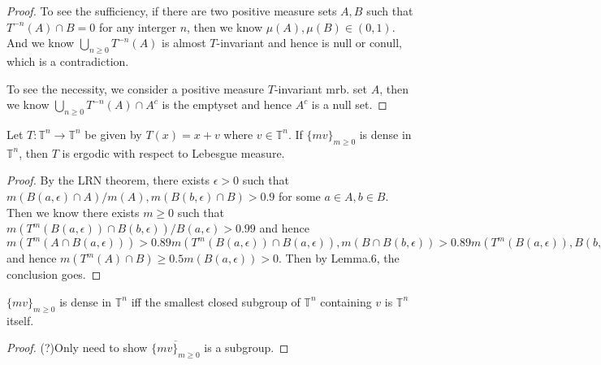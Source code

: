 \documentclass[lang=en, color=blue, ]{elegantbook}
\newcommand{\T}{\mathbb{T}}
\begin{document}
\begin{proof}\par
    To see the sufficiency, if there are two positive measure sets $A,B$ such that $T^{-n}(A)\cap B =0$ for any interger $n$, then we know $\mu(A),\mu(B)\in(0,1)$. And we know $\bigcup_{n\geq 0}T^{-n}(A)$ is almost $T$-invariant and hence is null or conull, which is a contradiction.\par
    To see the necessity, we consider a positive measure $T$-invariant mrb. set $A$, then we know $\bigcup_{n\geq 0}T^{-n}(A) \cap A^c$ is the emptyset and hence $A^c$ is a null set.
\end{proof}
\begin{lemma}
Let $T:\T^n\to \T^n$ be given by $T(x)=x+v$ where $v\in\T^n$. If $\{mv\}_{m\geq 0}$ is dense in $\T^n$, then $T$ is ergodic with respect to Lebesgue measure.
\end{lemma}
\begin{proof}\par
    By the LRN theorem, there exists $\epsilon > 0$ such that $m(B(a,\epsilon)\cap A)/m(A), m(B(b,\epsilon)\cap B)>0.9$ for some $a\in A,b\in B$. Then we know there exists $m\geq 0$ such that $m(T^m(B(a,\epsilon))\cap B(b,\epsilon))/B(a,\epsilon) > 0.99$ and hence $m(T^m(A\cap B(a,\epsilon))) > 0.89 m(T^m(B(a,\epsilon))\cap B(a,\epsilon)), m(B\cap B(b,\epsilon))> 0.89 m(T^m(B(a,\epsilon)),B(b,\epsilon))$ and hence $m(T^m(A)\cap B) \geq 0.5 m(B(a,\epsilon)) >0$. Then by Lemma.6, the conclusion goes. 
\end{proof}
\begin{remark}
$\{mv\}_{m\geq 0}$ is dense in $\T^n$ iff the smallest closed subgroup of $\T^n$ containing $v$ is $\T^n$ itself.
\end{remark}
\begin{proof}\par
    (?)Only need to show $\overline{\{mv\}_{m\geq 0}}$ is a subgroup.
\end{proof}
\end{document}
